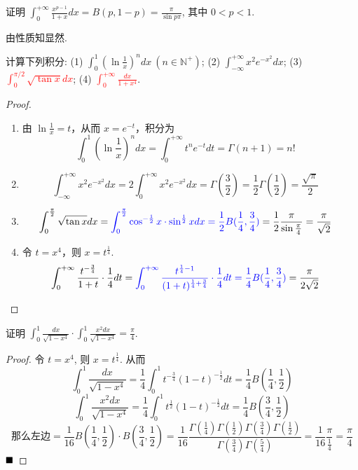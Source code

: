 \documentclass[lang=cn,newtx,10pt,scheme=chinese]{elegantbook}
\begin{document}
\begin{example}
证明 $\int_0^{+\infty} \frac{x^{p-1}}{1+x} dx = B(p, 1-p) = \frac{\pi}{\sin p\pi}$, 其中 $0 < p < 1$.
\end{example}
\begin{remark}
    由性质知显然.
\end{remark}
\begin{example}
计算下列积分:
(1) $\int_{0}^{1} \left(\ln \frac{1}{x}\right)^n dx \ (n \in \mathbb{N}^+)$; \quad (2) $\int_{-\infty}^{+\infty} x^2 e^{-x^2} dx$; \quad (3) \textcolor{red}{$\int_0^{\pi/2} \sqrt{\tan x} dx$}; \quad (4) \textcolor{red}{$\int_0^{+\infty} \frac{dx}{1+x^4}$}.
\end{example}

\begin{proof}
\begin{enumerate}
    \item 由 $\ln\frac{1}{x} = t$，从而 $x=e^{-t}$，积分为
    $$ \int_0^1 (\ln\frac{1}{x})^n dx = \int_0^{+\infty} t^n e^{-t} dt = \Gamma(n+1) = n! \quad  $$
    \item
    $$ \int_{-\infty}^{+\infty} x^2 e^{-x^2} dx = 2\int_0^{+\infty} x^2 e^{-x^2} dx = \Gamma(\frac{3}{2}) = \frac{1}{2}\Gamma(\frac{1}{2}) = \frac{\sqrt{\pi}}{2} \quad  $$
    \item
    $$ \int_0^{\frac{\pi}{2}} \sqrt{\tan x} dx = \textcolor{blue}{\int_0^{\frac{\pi}{2}} \cos^{-\frac{1}{2}}x \cdot \sin^{\frac{1}{2}}x dx = \frac{1}{2}B(\frac{1}{4}, \frac{3}{4}) }= \frac{1}{2} \frac{\pi}{\sin\frac{\pi}{4}} = \frac{\pi}{\sqrt{2}} \quad  $$
    \item 令 $t=x^4$，则 $x=t^{\frac{1}{4}}$.
    $$ \int_0^{+\infty} \frac{t^{-\frac{3}{4}}}{1+t} \cdot \frac{1}{4} dt =\textcolor{blue}{\int_0^{+\infty} \frac{t^{\frac{1}{4} - 1}}{(1+t)^{\frac{1}{4}+\frac{3}{4}}} \cdot \frac{1}{4} dt= \frac{1}{4}B(\frac{1}{4}, \frac{3}{4}) }= \frac{\pi}{2\sqrt{2}} \quad  $$
\end{enumerate}
\end{proof}

\begin{example}
证明 $\int_{0}^{1} \frac{dx}{\sqrt{1-x^4}} \cdot \int_{0}^{1} \frac{x^2 dx}{\sqrt{1-x^4}} = \frac{\pi}{4}$.
\end{example}

\begin{proof}
令 $t=x^4$, 则 $x=t^{\frac{1}{4}}$.
从而 
$$
 \int_0^1 \frac{dx}{\sqrt{1-x^4}} = \frac{1}{4}\int_0^1 t^{-\frac{3}{4}}(1-t)^{-\frac{1}{2}}dt = \frac{1}{4}B(\frac{1}{4}, \frac{1}{2})
$$
$$
\int_0^1 \frac{x^2 dx}{\sqrt{1-x^4}} = \frac{1}{4}\int_0^1 t^{\frac{1}{2}}(1-t)^{-\frac{1}{2}}dt = \frac{1}{4}B(\frac{3}{4}, \frac{1}{2})
$$
$$
\text{那么左边}= \frac{1}{16} B(\frac{1}{4}, \frac{1}{2}) \cdot B(\frac{3}{4}, \frac{1}{2}) = \frac{1}{16} \frac{\Gamma(\frac{1}{4})\Gamma(\frac{1}{2})\Gamma(\frac{3}{4})\Gamma(\frac{1}{2})}{\Gamma(\frac{3}{4})\Gamma(\frac{5}{4})} = \frac{1}{16}\frac{\pi}{\frac{1}{4}} = \frac{\pi}{4}
$$
$\hfill \blacksquare$
\end{proof}
\end{document}
